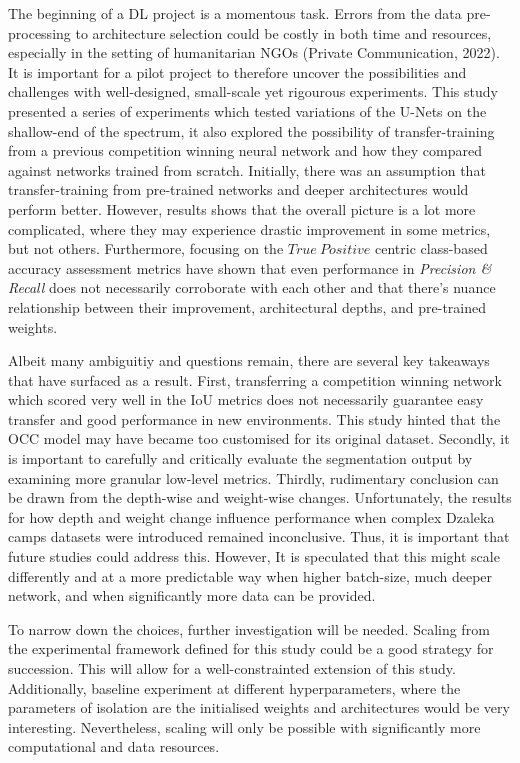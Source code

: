\documentclass[11pt, a4paper, twoside]{report}
\begin{document}
The beginning of a DL project is a momentous task. Errors from the data pre-processing to architecture selection could be costly in both time and resources, especially in the setting of humanitarian NGOs (Private Communication, 2022). It is important for a pilot project to therefore uncover the possibilities and challenges with well-designed, small-scale yet rigourous experiments. This study presented a series of experiments which tested variations of the U-Nets on the shallow-end of the spectrum, it also explored the possibility of transfer-training from a previous competition winning neural network and how they compared against networks trained from scratch. Initially, there was an assumption that transfer-training from pre-trained networks and deeper architectures would perform better. However, results shows that  the overall picture is a lot more complicated, where they may experience drastic improvement in some metrics, but not others. Furthermore, focusing on the $True\ Positive$ centric class-based accuracy assessment metrics have shown that even performance in \textit{Precision \& Recall} does not necessarily corroborate with each other and that there's nuance relationship between their improvement, architectural depths, and pre-trained weights.\\\par

Albeit many ambiguitiy and questions remain, there are several key takeaways that have surfaced as a result. First, transferring a competition winning network which scored very well in the IoU metrics does not necessarily guarantee easy transfer and good performance in new environments. This study hinted that the OCC model may have became too customised for its original dataset. Secondly, it is important to carefully and critically evaluate the segmentation output by examining more granular low-level metrics. Thirdly, rudimentary conclusion can be drawn from the depth-wise and weight-wise changes. Unfortunately, the results for how depth and weight change influence performance when complex Dzaleka camps datasets were introduced remained inconclusive. Thus, it is important that future studies could address this. However, It is speculated that this might scale differently and at a more predictable way when higher batch-size, much deeper network, and when significantly more data can be provided.\\\par

To narrow down the choices, further investigation will be needed. Scaling from the experimental framework defined for this study could be a good strategy for succession. This will allow for a well-constrainted extension of this study. Additionally, baseline experiment at different hyperparameters, where the parameters of isolation are the initialised weights and architectures would  be very interesting. Nevertheless, scaling will only be possible with significantly more computational and data resources.\\\par
\end{document}
